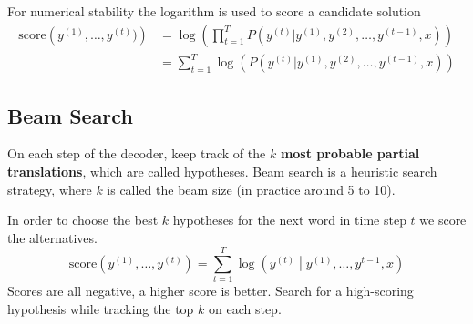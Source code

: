 \documentclass[11pt]{article}
\begin{document}
For numerical stability the logarithm is used to score a candidate solution
\begin{align*}
	\text{score}\left(y^{(1)},\dots,y^{(t)})\right) &= \log\left( \prod_{t=1}^{T} P(y^{(t)}|y^{(1)},y^{(2)},\dots,y^{(t-1)},x) \right)\\
	&= \sum_{t=1}^{T} \log\left(P(y^{(t)}|y^{(1)},y^{(2)},\dots,y^{(t-1)},x)\right)
\end{align*}

\clearpage

\subsection{Beam Search}
On each step of the decoder, keep track of the $k$ \textbf{most probable partial translations}, which are called hypotheses. Beam search is a heuristic search strategy, where $k$ is called the beam size (in practice around 5 to 10).

In order to choose the best $k$ hypotheses for the next word in time step $t$ we score the alternatives.
\begin{equation*}
	\text{score}\left(y^{(1)},\dots,y^{(t)}\right) = \sum_{t=1}^{T} \log\left( y^{(t)} \middle| y^{(1)},\dots,y^{t-1}, x \right)
\end{equation*}
Scores are all negative, a higher score is better. Search for a high-scoring hypothesis while tracking the top $k$ on each step.
\end{document}
